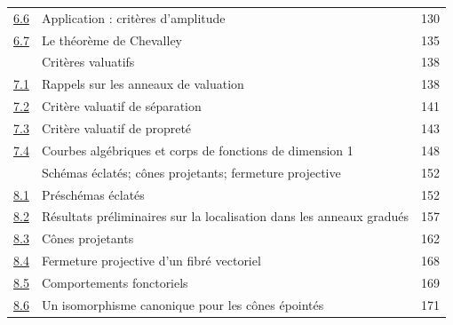 \begin{longtable}{@{}p{}p{}r@{}}
\hyperref[subsection:II.6.6-fr]{6.6} & Application : critères d'amplitude & 130\\
\hyperref[subsection:II.6.7-fr]{6.7} & Le théorème de Chevalley & 135\\
\hyperref[section:II.7-fr]{\textsection7} & Critères valuatifs & 138\\
\hyperref[subsection:II.7.1-fr]{7.1} & Rappels sur les anneaux de valuation & 138\\
\hyperref[subsection:II.7.2-fr]{7.2} & Critère valuatif de séparation & 141\\
\hyperref[subsection:II.7.3-fr]{7.3} & Critère valuatif de propreté & 143\\
\hyperref[subsection:II.7.4-fr]{7.4} & Courbes algébriques et corps de fonctions de dimension 1 & 148\\
\hyperref[section:II.8-fr]{\textsection8} & Schémas éclatés; cônes projetants; fermeture projective & 152\\
\hyperref[subsection:II.8.1-fr]{8.1} & Préschémas éclatés & 152\\
\hyperref[subsection:II.8.2-fr]{8.2} & Résultats préliminaires sur la localisation dans les anneaux gradués & 157\\
\hyperref[subsection:II.8.3-fr]{8.3} & Cônes projetants & 162\\
\hyperref[subsection:II.8.4-fr]{8.4} & Fermeture projective d'un fibré vectoriel & 168\\
\hyperref[subsection:II.8.5-fr]{8.5} & Comportements fonctoriels & 169\\
\hyperref[subsection:II.8.6-fr]{8.6} & Un isomorphisme canonique pour les cônes épointés & 171\\
\end{longtable}
